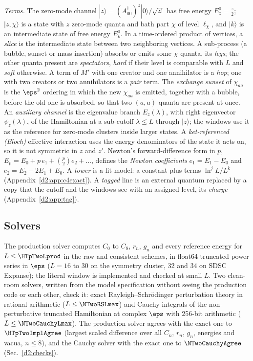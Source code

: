 \emph{Terms.} The zero-mode channel $|z\rangle=(A_{00}^\dagger)^z|0\rangle/\sqrt{z!}$ has free energy $E^0_z=\frac z2$;
$|z,\chi\rangle$ is a state with $z$ zero-mode quanta and bath part $\chi$ of level $\ell_\chi$, and $|k\rangle$ is an
intermediate state of free energy $E^0_k$. In a time-ordered product of vertices, a \emph{slice} is the intermediate state
between two neighboring vertices. A sub-process (a bubble, sunset or mass insertion) absorbs or emits some $\chi$ quanta,
its \emph{legs}; the other quanta present are \emph{spectators}, \emph{hard} if their level is comparable with $L$ and
\emph{soft} otherwise. A term of $M'$ with one creator and one annihilator is a \emph{hop}; one with two creators or two
annihilators is a \emph{pair} term. The \emph{exchange sunset} of $\chi_{aa}$ is the $\eps^2$ ordering in which the new
$\chi_{aa}$ is emitted, together with a bubble, before the old one is absorbed, so that two $(a,a)$ quanta are present at
once. An \emph{auxiliary channel} is the eigenvalue branch $E_z(\lambda)$, with right eigenvector $\psi_z(\lambda)$, of the
Hamiltonian at a sub-cutoff $\lambda\le L$ through $|z\rangle$; the windows use it as the reference for zero-mode clusters
inside larger states. A \emph{ket-referenced (Bloch)} effective interaction uses the energy denominators of the state it acts
on, so it is not symmetric in $z$ and $z'$. Newton's forward-difference form in $p$, $E_p=E_0+p\,e_1+\binom p2e_2+\dots$,
defines the \emph{Newton coefficients} $e_1=E_1-E_0$ and $e_2=E_2-2E_1+E_0$. A \emph{tower} is a fit model: a constant plus
terms $\ln^jL/L^k$ (Appendix~\ref{d2:app:c4exact}). A \emph{tagged} line is an external quantum replaced by a copy that the
cutoff and the windows see with an assigned level, its \emph{charge} (Appendix~\ref{d2:app:tag}).

\subsection{Solvers}\label{d2:solvers}
The production solver  computes $C_0$ to $C_8$, $r_n$, $g_n$ and every reference energy for
$L\le\HTpTwoLprod$ in the raw and consistent schemes, in float64 truncated power series in $\eps$ ($L=16$ to 30 on the symmetry cluster, 32 and 34
on SDSC Expanse); the literal window is implemented and checked at small $L$. Two clean-room solvers, written from the model specification without seeing the production code or each other,
check it: exact Rayleigh--Schr\"odinger perturbation theory in rational arithmetic ($L\le\NTwoRSLmax$) and Cauchy integrals of
the non-perturbative truncated Hamiltonian at complex $\eps$ with 256-bit arithmetic ($L\le\NTwoCauchyLmax$). The production
solver agrees with the exact one to $\HTpTwoImplAgree$ (largest scaled difference over all $C_n$, $r_n$, $g_n$, energies and
vacua, $n\le8$), and the Cauchy solver with the exact one to $\NTwoCauchyAgree$ (Sec.~\ref{d2:checks}).

